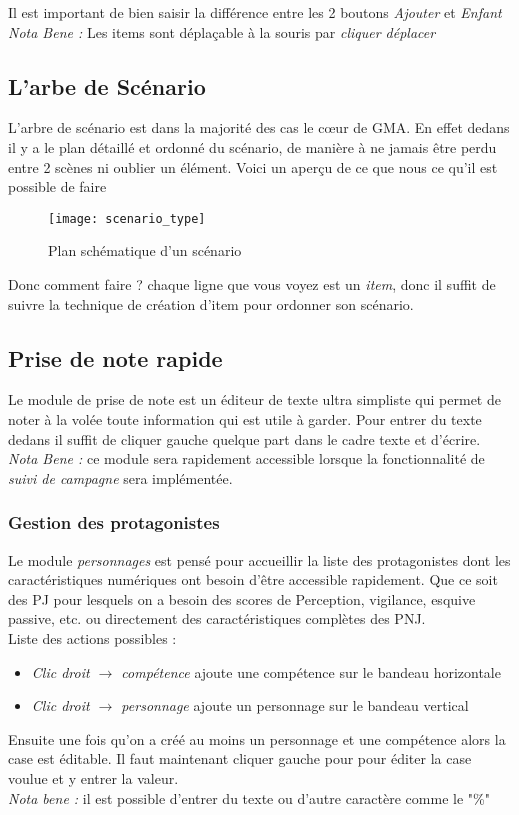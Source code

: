 \documentclass[12pt]{article}
\begin{document}
Il est important de bien saisir la différence entre les 2 boutons \emph{Ajouter} et \emph{Enfant}
\emph{Nota Bene :} Les items sont déplaçable à la souris par \emph{cliquer déplacer}

\subsection{L'arbe de Scénario}\label{scenario}
L'arbre de scénario est dans la majorité des cas le cœur de GMA. En effet dedans il y a le plan détaillé et ordonné du scénario, de manière à ne jamais être perdu entre 2 scènes ni oublier un élément.
Voici un aperçu de ce que nous ce qu'il est possible de faire
\begin{figure}[h]
    \texttt{[image: scenario\_type]}
    \caption{Plan schématique d'un scénario}
\end{figure}
Donc comment faire ?
chaque ligne que vous voyez est un \emph{item}, donc il suffit de suivre la technique de création d'item pour ordonner son scénario.


\subsection{Prise de note rapide}
Le module de prise de note est un éditeur de texte ultra simpliste qui permet de noter à la volée toute information qui est utile à garder. Pour entrer du texte dedans il suffit de cliquer gauche quelque part dans le cadre texte et d'écrire.\\
\emph{Nota Bene :} ce module sera rapidement accessible lorsque la fonctionnalité de \emph{suivi de campagne} sera implémentée.

\subsubsection{Gestion des protagonistes}\label{personnage}
Le module \emph{personnages} est pensé pour accueillir la liste des protagonistes dont les caractéristiques numériques ont besoin d'être accessible rapidement. Que ce soit des PJ pour lesquels on a besoin des scores de Perception, vigilance, esquive passive, etc. ou directement des caractéristiques complètes des PNJ.
\\
Liste des actions possibles :
\begin{itemize}
    \item \emph{Clic droit $\rightarrow$ compétence} ajoute une compétence sur le bandeau horizontale
    \item \emph{Clic droit $\rightarrow$ personnage} ajoute un personnage sur le bandeau vertical 
\end{itemize}
Ensuite une fois qu'on a créé au moins un personnage et une compétence alors la case est éditable. Il faut maintenant cliquer gauche pour pour éditer la case voulue et y entrer la valeur.
\\\emph{Nota bene :} il est possible d'entrer du texte ou d'autre caractère comme le "\%"
\end{document}
